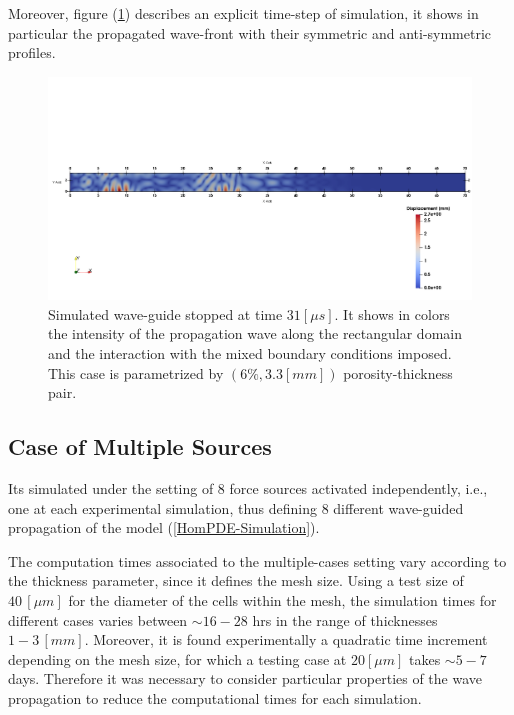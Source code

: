 Moreover, figure (\ref{Sim2D-TimeStep}) describes an explicit time-step of simulation, it shows in particular the propagated wave-front with their symmetric and anti-symmetric profiles.
\begin{figure}[!h]
	\centering
	\includegraphics[width=\textwidth]{images/ImgExt/SimP6TransIso33M780T310.png}
	\caption{Simulated wave-guide stopped at time $31 [\mu s]$. It shows in colors the intensity of the propagation wave along the rectangular domain and the interaction with the mixed boundary conditions imposed. This case is parametrized by $(6\%, 3.3 [mm])$ porosity-thickness pair.}
	\label{Sim2D-TimeStep}
\end{figure}



\subsection{Case of Multiple Sources}
Its simulated under the setting of 8 force sources activated independently, i.e., one at each experimental simulation, thus defining 8 different wave-guided propagation of the model (\ref{HomPDE-Simulation}).

\begin{rem}
The computation times associated to the multiple-cases setting vary according to the thickness parameter, since it defines the mesh size. Using a test size of $40 \, [\mu m]$ for the diameter of the cells within the mesh, the simulation times for different cases varies between $\sim 16-28$ hrs in the range of thicknesses $1-3 \, [mm]$. Moreover, it is found experimentally a quadratic time increment depending on the mesh size, for which a testing case at $20 [\mu m]$ takes $\sim 5-7$ days. 
Therefore it was necessary to consider particular properties of the wave propagation to reduce the computational times for each simulation.
\end{rem}

